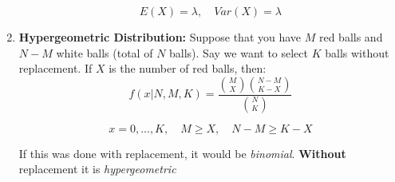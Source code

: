 \documentclass{article}
\begin{document}
\begin{enumerate}
    \begin{equation*}
        E(X) = \lambda, \quad Var(X) = \lambda
    \end{equation*}
    
    \item \textbf{Hypergeometric Distribution:} Suppose that you have $M$ red balls and $N-M$ white balls (total of $N$ balls). Say we want to select $K$ balls without replacement. If $X$ is the number of red balls, then:
    \begin{equation*}
        f(x|N,M,K) = \frac{{M \choose X} {{N-M}\choose{K-X}}}{{N\choose K}}
    \end{equation*}
    
    \begin{equation*}
        x = 0,...,K, \quad M \geq X, \quad N-M \geq K-X
    \end{equation*}
    
    If this was done with replacement, it would be \textit{binomial}. \textbf{Without} replacement it is \textit{hypergeometric}
    
\end{enumerate}    
    
\end{document}
